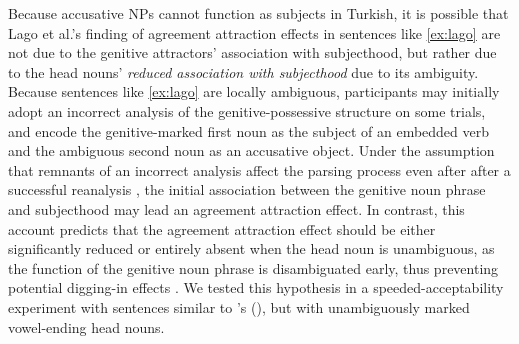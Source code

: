 \documentclass[apacite,linguex]{glossa}\usepackage[]{graphicx}\usepackage[]{color}
\begin{document}
Because accusative NPs cannot function as subjects in Turkish, it is possible that Lago et al.'s finding of agreement attraction effects in sentences like \ref{ex:lago} are not due to the genitive attractors' association with subjecthood, but rather due to the head nouns' \textit{reduced association with subjecthood} due to its ambiguity.
Because sentences like \ref{ex:lago} are locally ambiguous, participants may initially adopt an incorrect analysis of the genitive-possessive structure on some trials, and encode the genitive-marked first noun as the subject of an embedded verb and the ambiguous second noun as an accusative object. 
Under the assumption that remnants of an incorrect analysis affect the parsing process even after after a successful reanalysis \citep{Staub:2007}, the initial association between the genitive noun phrase and subjecthood may lead an agreement attraction effect. 
In contrast, this account predicts that the agreement attraction effect should be either significantly reduced or entirely absent when the head noun is unambiguous, as the function of the genitive noun phrase is disambiguated early, thus preventing potential digging-in effects \citep{Tabor:2004}.  
%
%
We tested this hypothesis in a speeded-acceptability experiment with sentences similar to \citeauthor{LagoEtAl:2019}'s (\citeyear{LagoEtAl:2019}), but with unambiguously marked vowel-ending head nouns. 
\end{document}
